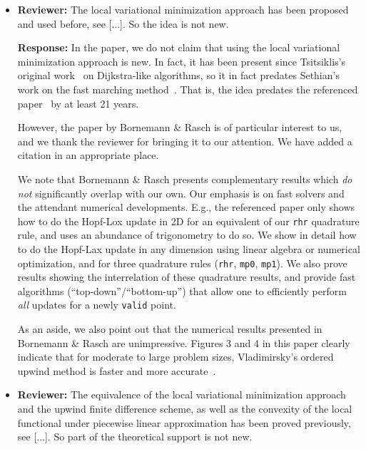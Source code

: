 \documentclass{article}
\begin{document}
\begin{itemize}

\item \textbf{Reviewer:} The local variational minimization approach
  has been proposed and used before, see [...]. So the idea is not
  new.

  \textbf{Response:} In the paper, we do not claim that using the
  local variational minimization approach is new. In fact, it has been
  present since Tsitsiklis's original
  work~\cite{tsitsiklis1995efficient} on Dijkstra-like algorithms, so
  it in fact predates Sethian's work on the fast marching
  method~\cite{sethian1996fast}. That is, the idea predates the
  referenced paper~\cite{bornemann2006finite} by at least 21 years.

  However, the paper by Bornemann \& Rasch is of particular interest
  to us, and we thank the reviewer for bringing it to our
  attention. We have added a citation in an appropriate place.

  We note that Bornemann \& Rasch presents complementary results which
  \emph{do not} significantly overlap with our own. Our emphasis is on
  fast solvers and the attendant numerical developments. E.g., the
  referenced paper only shows how to do the Hopf-Lox update in 2D for
  an equivalent of our \texttt{rhr} quadrature rule, and uses an
  abundance of trigonometry to do so. We show in detail how to do the
  Hopf-Lax update in any dimension using linear algebra or numerical
  optimization, and for three quadrature rules (\texttt{rhr},
  \texttt{mp0}, \texttt{mp1}). We also prove results showing the
  interrelation of these quadrature results, and provide fast
  algorithms (``top-down''/``bottom-up'') that allow one to
  efficiently perform \emph{all} updates for a newly \texttt{valid}
  point.

  As an aside, we also point out that the numerical results presented
  in Bornemann \& Rasch are unimpressive. Figures 3 and 4 in this
  paper clearly indicate that for moderate to large problem sizes,
  Vladimirsky's ordered upwind method is faster and more
  accurate~\cite{sethian2003ordered}.

\item \textbf{Reviewer:} The equivalence of the local variational
  minimization approach and the upwind finite difference scheme, as
  well as the convexity of the local functional under piecewise linear
  approximation has been proved previously, see [...]. So part of the
  theoretical support is not new.


\end{itemize}
\end{document}
